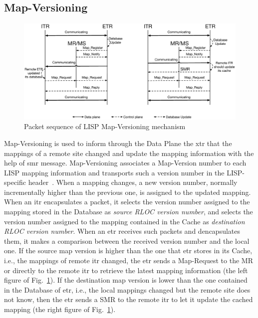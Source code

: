 \subsection{Map-Versioning}
\label{sec:MapVersionning}
\begin{figure}[!t]
	\centering
	\includegraphics[width=\textwidth]{Pics/Map_versioning_schema.eps}
	\caption{Packet sequence of LISP Map-Versioning mechanism}
	\label{Map_versioning_schema}
\end{figure}
Map-Versioning is used to inform through the Data Plane the \acrshort{xtr} that the mappings of a remote site changed and update the mapping information with the help of \acrshort{smr} message. Map-Versioning associates a Map-Version number to each LISP mapping information and transports such a version number in the LISP-specific header~\cite{rfc6834}. When a mapping changes, a new version number, normally incrementally higher than the previous one, is assigned to the updated mapping. When an \acrshort{itr} encapsulates a packet, it selects the version number assigned to the mapping stored in the Database as \emph{source RLOC version number}, and selects the version number assigned to the mapping contained in the Cache as \emph{destination RLOC version number}. When an \acrshort{etr} receives such packets and dencapsulates them, it makes a comparison between the received version number and the local one. If the source map version is higher than the one that \acrshort{etr} stores in its Cache, i.e., the mappings of remote \acrshort{itr} changed, the \acrshort{etr} sends a Map-Request to the MR or directly to the remote \acrshort{itr} to retrieve the latest mapping information (the left figure of Fig.~\ref{Map_versioning_schema}). If the destination map version is lower than the one contained in the Database of \acrshort{etr}, i.e., the local mappings changed but the remote site does not know, then the \acrshort{etr} sends a SMR to the remote \acrshort{itr} to let it update the cached mapping (the right figure of Fig.~\ref{Map_versioning_schema}).


